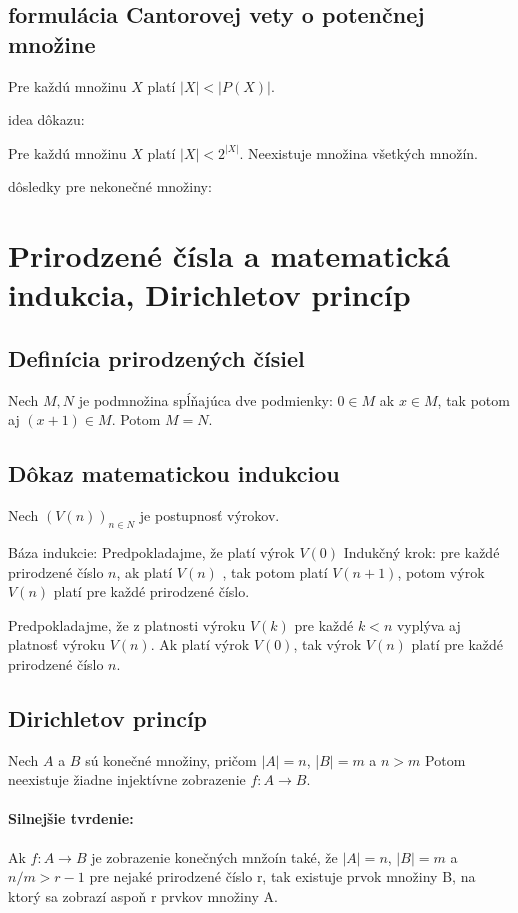 	\subsection{formulácia Cantorovej vety o potenčnej množine}
	Pre každú množinu $X$ platí $|X| < |P (X)|$.
	
	idea dôkazu:






	Pre každú množinu $X$ platí $|X| < 2^{|X|}$.
	Neexistuje množina všetkých množín.


	dôsledky pre nekonečné množiny:






\section {Prirodzené čísla a matematická indukcia, Dirichletov princíp}

	\subsection{Definícia prirodzených čísiel}
		Nech $M, N$ je podmnožina spĺňajúca dve podmienky:
		$0 \in M$
		ak $x \in M$, tak potom aj $(x + 1) \in M$.
		Potom $M = N$.



	\subsection{Dôkaz matematickou indukciou}
		Nech $(V(n))_{n \in N}$ je postupnosť výrokov. 

		Báza indukcie: Predpokladajme, že platí výrok $V(0)$
		Indukčný krok: pre každé prirodzené číslo $n$, ak platí $V(n)$ , tak potom platí $V(n + 1)$, potom výrok $V(n)$ platí pre každé prirodzené číslo.
		
		Predpokladajme, že z platnosti výroku $V(k)$ pre každé $k < n$ vyplýva aj platnosť výroku $V(n)$. Ak platí výrok $V(0)$, tak výrok $V(n)$ platí pre každé prirodzené číslo $n$.
	\subsection{Dirichletov princíp}
		Nech $A$ a $B$ sú konečné množiny, pričom $|A| = n$, |$B| = m$ a $n > m$
		Potom neexistuje žiadne injektívne zobrazenie $f : A \rightarrow B$.

		\paragraph{Silnejšie tvrdenie: }
		Ak $f : A \rightarrow B$ je zobrazenie konečných mnžoín také, že $|A| = n$, $|B| = m$ a $n/m > r - 1$ pre nejaké prirodzené číslo r, tak existuje prvok množiny B, na ktorý sa zobrazí aspoň r prvkov množiny A.

